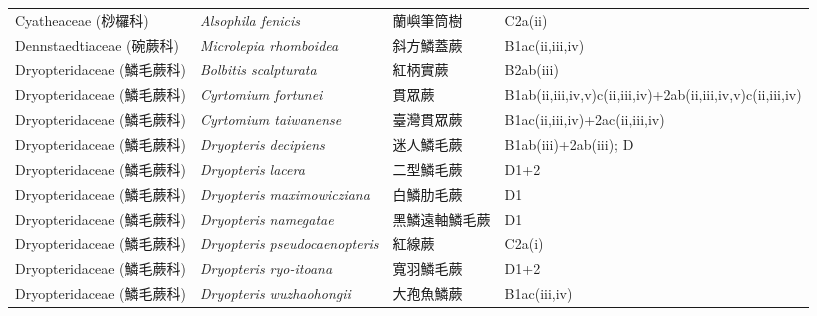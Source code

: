 \begin{longtable}{p{3cm}p{5cm}p{3cm}p{4cm}}
    Cyatheaceae (桫欏科) & \textit{Alsophila fenicis}  & 蘭嶼筆筒樹 & C2a(ii) \index{Alsophila@\textit{Alsophila}!fenicis@\textit{fenicis}}  \index{蘭嶼筆筒樹} \\
    Dennstaedtiaceae (碗蕨科) & \textit{Microlepia rhomboidea}  & 斜方鱗蓋蕨 & B1ac(ii,iii,iv) \index{Microlepia@\textit{Microlepia}!rhomboidea@\textit{rhomboidea}}  \index{斜方鱗蓋蕨} \\
    Dryopteridaceae (鱗毛蕨科) & \textit{Bolbitis scalpturata}  & 紅柄實蕨 & B2ab(iii) \index{Bolbitis@\textit{Bolbitis}!scalpturata@\textit{scalpturata}}  \index{紅柄實蕨} \\
    Dryopteridaceae (鱗毛蕨科) & \textit{Cyrtomium fortunei}  & 貫眾蕨 & B1ab(ii,iii,iv,v)c(ii,iii,iv)+2ab(ii,iii,iv,v)c(ii,iii,iv) \index{Cyrtomium@\textit{Cyrtomium}!fortunei@\textit{fortunei}}  \index{貫眾蕨} \\
    Dryopteridaceae (鱗毛蕨科) & \textit{Cyrtomium taiwanense}  & 臺灣貫眾蕨 & B1ac(ii,iii,iv)+2ac(ii,iii,iv) \index{Cyrtomium@\textit{Cyrtomium}!taiwanense@\textit{taiwanense}}  \index{臺灣貫眾蕨} \\
    Dryopteridaceae (鱗毛蕨科) & \textit{Dryopteris decipiens}  & 迷人鱗毛蕨 & B1ab(iii)+2ab(iii); D \index{Dryopteris@\textit{Dryopteris}!decipiens@\textit{decipiens}}  \index{迷人鱗毛蕨} \\
    Dryopteridaceae (鱗毛蕨科) & \textit{Dryopteris lacera}  & 二型鱗毛蕨 & D1+2 \index{Dryopteris@\textit{Dryopteris}!lacera@\textit{lacera}}  \index{二型鱗毛蕨} \\
    Dryopteridaceae (鱗毛蕨科) & \textit{Dryopteris maximowicziana}  & 白鱗肋毛蕨 & D1 \index{Dryopteris@\textit{Dryopteris}!maximowicziana@\textit{maximowicziana}}  \index{白鱗肋毛蕨} \\
    Dryopteridaceae (鱗毛蕨科) & \textit{Dryopteris namegatae}  & 黑鱗遠軸鱗毛蕨 & D1 \index{Dryopteris@\textit{Dryopteris}!namegatae@\textit{namegatae}}  \index{黑鱗遠軸鱗毛蕨} \\
    Dryopteridaceae (鱗毛蕨科) & \textit{Dryopteris pseudocaenopteris}  & 紅線蕨 & C2a(i) \index{Dryopteris@\textit{Dryopteris}!pseudocaenopteris@\textit{pseudocaenopteris}}  \index{紅線蕨} \\
    Dryopteridaceae (鱗毛蕨科) & \textit{Dryopteris ryo-itoana}  & 寬羽鱗毛蕨 & D1+2 \index{Dryopteris@\textit{Dryopteris}!ryo-itoana@\textit{ryo-itoana}}  \index{寬羽鱗毛蕨} \\
    Dryopteridaceae (鱗毛蕨科) & \textit{Dryopteris wuzhaohongii}  & 大孢魚鱗蕨 & B1ac(iii,iv) \index{Dryopteris@\textit{Dryopteris}!wuzhaohongii@\textit{wuzhaohongii}}  \index{大孢魚鱗蕨} \\

\end{longtable}
